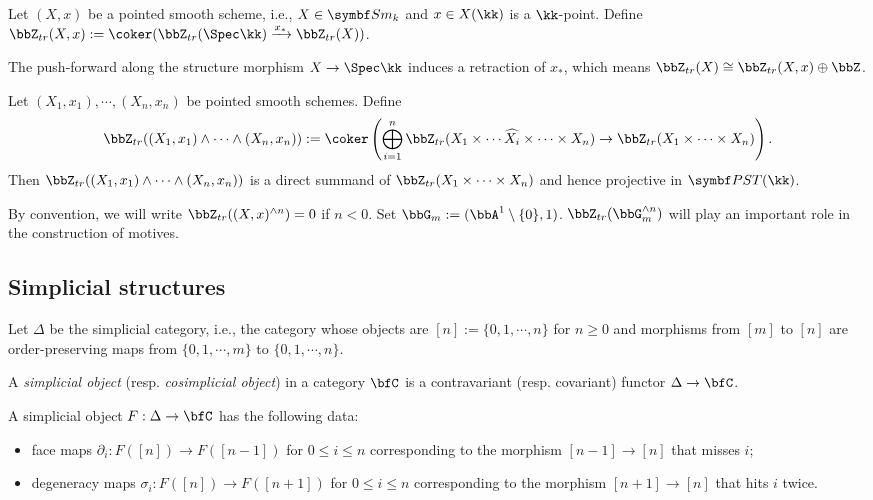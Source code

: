   \begin{definition}
    Let $(X,x)$ be a pointed smooth scheme, i.e., $X\in \Sm_k$ and $x\in X(\kk)$ is a $\kk$-point.
    Define $\bbZ_{tr}(X,x) := \coker(\bbZ_{tr}(\Spec \kk) \xrightarrow{x_*} \bbZ_{tr}(X))$.
  \end{definition}

  The push-forward along the structure morphism $X\to \Spec \kk$ induces a retraction of $x_*$, which means $\bbZ_{tr}(X) \cong \bbZ_{tr}(X,x) \oplus \bbZ$.

  Let $(X_1,x_1), \cdots, (X_n,x_n)$ be pointed smooth schemes.
  Define 
  \[ \bbZ_{tr}((X_1,x_1) \wedge \cdots \wedge (X_n,x_n)) := \coker\left( \bigoplus_{i=1}^n \bbZ_{tr}(X_1\times \cdots \widehat{X_i} \times \cdots \times X_n) \to \bbZ_{tr}(X_1\times \cdots \times X_n) \right). \]
  Then $\bbZ_{tr}((X_1,x_1) \wedge \cdots \wedge (X_n,x_n))$ is a direct summand of $\bbZ_{tr}(X_1\times \cdots \times X_n)$ and hence projective in $\PST(\kk)$.

  By convention, we will write $\bbZ_{tr}((X,x)^{\wedge n}) = 0$ if $n < 0$.
  Set $\bbG_m := (\bbA^1\setminus \{0\}, 1)$.
  $\bbZ_{tr}(\bbG_m^{\wedge n})$ will play an important role in the construction of motives.

\subsection{Simplicial structures}

  Let $\Delta$ be the simplicial category, i.e., the category whose objects are $[n] := \{0,1,\cdots,n\}$ for $n\geq 0$ and morphisms from $[m]$ to $[n]$ are order-preserving maps from $\{0,1,\cdots,m\}$ to $\{0,1,\cdots,n\}$.

  \begin{definition}
    A \emph{simplicial object} (resp. \emph{cosimplicial object}) in a category $\bfC$ is a contravariant (resp. covariant) functor $\Delta \to \bfC$.
  \end{definition}

  A simplicial object $F: \Delta \to \bfC$ has the following data:
  \begin{itemize}
    \item face maps $\partial_i: F([n]) \to F([n-1])$ for $0\leq i \leq n$ corresponding to the morphism $[n-1] \to [n]$ that misses $i$;
    \item degeneracy maps $\sigma_i: F([n]) \to F([n+1])$ for $0\leq i \leq n$ corresponding to the morphism $[n+1] \to [n]$ that hits $i$ twice.
  \end{itemize}

